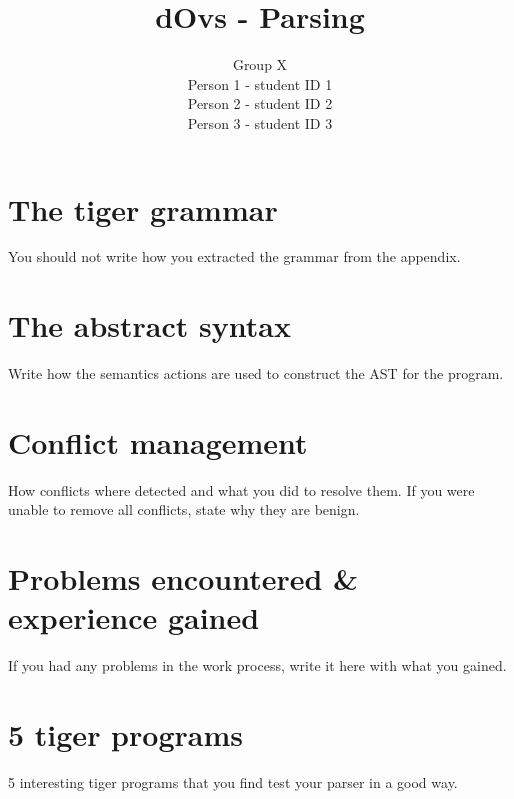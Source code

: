 \documentclass{article}
\title{dOvs - Parsing}
\author{
  Group X \\
  Person 1 - student ID 1\\
  Person 2 - student ID 2\\
  Person 3 - student ID 3
}
\begin{document}
\maketitle

\section{The tiger grammar}
You should not write how you extracted the grammar from the appendix.

\section{The abstract syntax}
Write how the semantics actions are used to construct the AST for the program.

\section{Conflict management}
How conflicts where detected and what you did to resolve them. If you were unable to remove all conflicts, state why they are benign.

\section{Problems encountered \& experience gained}
If you had any problems in the work process, write it here with what you gained.

\section{5 tiger programs}
5 interesting tiger programs that you find test your parser in a good way.
\end{document}

